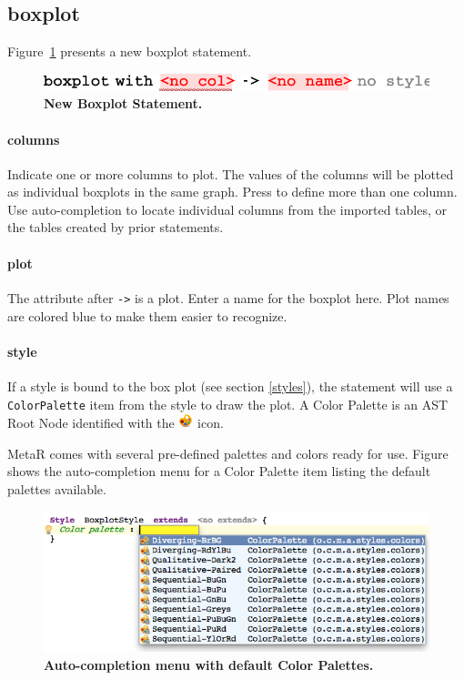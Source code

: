 \subsection{boxplot}
Figure~\ref{fig:NewBoxPlot} presents a new boxplot statement.

\begin{figure}
  \centering
  \includegraphics[width=\figWidthNarrow]{figures/NewBoxplot.pdf}
\caption[New Boxplot Statement.]{\textbf{New Boxplot Statement.}}
\label{fig:NewBoxPlot}
\end{figure}

\paragraph{columns}
Indicate one or more columns to plot. The values of the columns will be plotted as individual boxplots in the same graph. Press \keys{\enter} to define more than one column. Use auto-completion to locate individual columns from the imported tables, or the tables created by prior statements. 

\paragraph{plot}
The attribute after \texttt{->} is a plot. Enter a name for the boxplot here. Plot names are colored blue to make them easier to recognize.

\paragraph{style} \label{ColorPaletteDesc}
If a style is bound to the box plot (see section \ref{styles}),  the statement will use a \texttt{Color\allowbreak{}Palette} item from the style to draw the plot. A Color Palette is an AST Root Node identified with the  \includegraphics[height=2ex]{figures/palette.png} icon. 

MetaR comes with several pre-defined palettes and colors ready for use. Figure shows the auto-completion menu for a Color Palette item listing the default palettes available.

\begin{figure}[h!tbp]
  \centering
  \includegraphics[width=\figWidthWide]{figures/ColorPaletteItem.png}
\caption[Color Palette Item.]{\textbf{Auto-completion menu with default Color Palettes.}}
\label{fig:ColorPaletteItem}
\end{figure}

